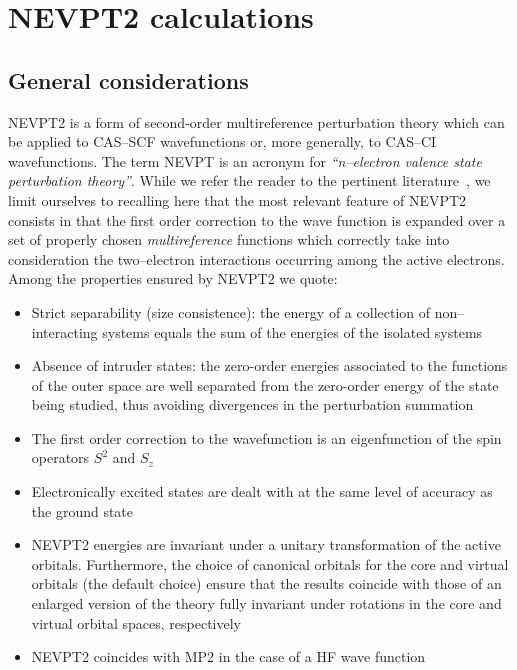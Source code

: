 \chapter{NEVPT2 calculations}\label{ch:nevpt2}

\section{General considerations}\label{sec:nevptgeneral}
NEVPT2  is a form of second-order multireference
perturbation theory 
which can be applied to CAS--SCF wavefunctions or, more generally, to
CAS--CI wavefunctions. The term NEVPT is an acronym for
\textit{``n--electron valence state perturbation theory''}. While we
refer the reader to the pertinent
literature~\cite{nevpt1,nevpt2,nevpt3,nevpt4}, we limit ourselves to
recalling here that the most relevant feature of NEVPT2 consists in
that the first order correction to the wave function is expanded over a
set of properly chosen \emph{multireference} functions which correctly
take into consideration the two--electron interactions occurring among
the active electrons. Among the properties ensured by NEVPT2 we quote:

\begin{itemize}
\item Strict separability (size consistence): the energy of a
  collection of non--interacting systems equals the sum of the
  energies of the isolated systems
\item Absence of intruder states: the zero-order energies associated
  to the functions of the outer space are well separated from the
  zero-order energy of the state being studied, thus avoiding
  divergences in   the perturbation summation
\item The first order correction to the wavefunction is an
  eigenfunction of the spin operators $S^2$ and $S_z$
\item Electronically excited states are dealt with at the same level
  of accuracy as the ground state
\item NEVPT2 energies are invariant under a unitary transformation of
  the active orbitals. Furthermore, the choice of canonical orbitals
  for the core and virtual orbitals (the default choice) ensure that
  the results coincide with those of an enlarged version of the theory
  fully invariant under rotations in the core and virtual orbital
  spaces, respectively~\cite{nevpt4}
\item NEVPT2 coincides with MP2 in the case of a HF wave function
\end{itemize}


